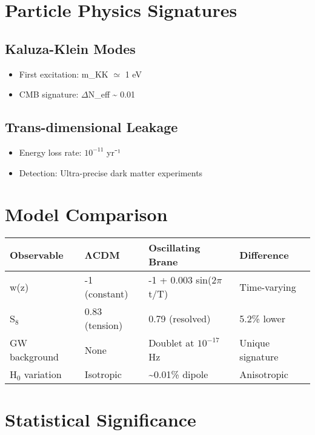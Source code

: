 \documentclass[
  11pt,
]{report}
\providecommand{\tightlist}{%
  \setlength{\itemsep}{0pt}\setlength{\parskip}{0pt}}
\begin{document}
\section{Particle Physics Signatures}\label{particle-physics-signatures}

\subsection{Kaluza-Klein Modes}\label{kaluza-klein-modes}

\begin{itemize}
\tightlist
\item
  First excitation: m\_KK \(\simeq\) 1 eV
\item
  CMB signature: \(\Delta\)N\_eff \textasciitilde{} 0.01
\end{itemize}

\subsection{Trans-dimensional Leakage}\label{trans-dimensional-leakage}

\begin{itemize}
\tightlist
\item
  Energy loss rate: \(10^{-11}\) yr⁻¹
\item
  Detection: Ultra-precise dark matter experiments
\end{itemize}

\section{Model Comparison}\label{model-comparison}

\begin{longtable}[]{@{}llll@{}}
\toprule\noalign{}
Observable & ΛCDM & Oscillating Brane & Difference \\
\midrule\noalign{}
\endhead
\bottomrule\noalign{}
\endlastfoot
w(z) & -1 (constant) & -1 + 0.003 sin(2\(\pi\)t/T) & Time-varying \\
S\(_8\) & 0.83 (tension) & 0.79 (resolved) & 5.2\% lower \\
GW background & None & Doublet at \(10^{-17}\) Hz & Unique signature \\
H\(_0\) variation & Isotropic & \textasciitilde0.01\% dipole &
Anisotropic \\
\end{longtable}

\section{Statistical Significance}\label{statistical-significance}
\end{document}
